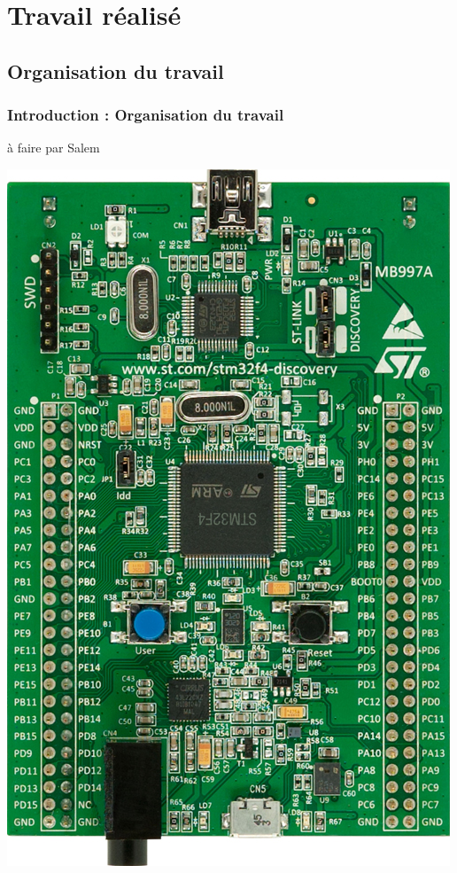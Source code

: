 \documentclass{beamer}
\begin{document}
\section{Travail réalisé}
\subsection{Organisation du travail}
\begin{frame}
\frametitle{Introduction : Organisation du travail}
à faire par Salem
\begin{center}
 \includegraphics[scale=0.1]{../images/stm32f4_discovery.jpg}
\end{center}
\end{frame}
\end{document}
